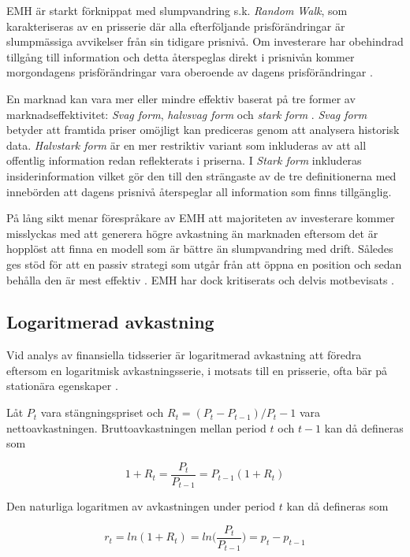 \documentclass[11pt]{article}
\begin{document}
EMH är starkt förknippat med slumpvandring s.k. \emph{Random Walk}, som karakteriseras av en prisserie där alla efterföljande prisförändringar är slumpmässiga avvikelser från sin tidigare prisnivå. Om investerare har obehindrad tillgång till information och detta återspeglas direkt i prisnivån kommer morgondagens prisförändringar vara oberoende av dagens prisförändringar \parencite{EMH}. 

En marknad kan vara mer eller mindre effektiv baserat på tre former av marknadseffektivitet: \emph{Svag form}, \emph{halvsvag form} och \emph{stark form} \parencite{Fama1970}. \emph{Svag form} betyder att framtida priser omöjligt kan prediceras genom att analysera historisk data. \emph{Halvstark form} är en mer restriktiv variant som inkluderas av att all offentlig information redan reflekterats i priserna. I \emph{Stark form} inkluderas insiderinformation vilket gör den till den strängaste av de tre definitionerna med innebörden att dagens prisnivå återspeglar all information som finns tillgänglig.

På lång sikt menar förespråkare av EMH att majoriteten av investerare kommer misslyckas med att generera högre avkastning än marknaden eftersom det är hopplöst att finna en modell som är bättre än slumpvandring med drift. Således ges stöd för att en passiv strategi som utgår från att öppna en position och sedan behålla den är mest effektiv \parencite{EMHforecast}. EMH har dock kritiserats och delvis motbevisats \parencite{basu1977investment, ball1978anomalies}.

\subsection{Logaritmerad avkastning}
Vid analys av finansiella tidsserier är logaritmerad avkastning att föredra eftersom en logaritmisk avkastningsserie, i motsats till en prisserie, ofta bär på stationära egenskaper \parencite{Tsay2010}.

Låt \(P_t\) vara stängningspriset och $R_{t}= (P_{t} - P_{t-1}) / {P_t-1}$ vara nettoavkastningen. Bruttoavkastningen mellan period $t$ och $t-1$ kan då defineras som

\begin{equation}
    1+R_{t} = \frac{P_{t}}{P_{t-1}} = P_{t-1}(1+R_{t})
\end{equation}

Den naturliga logaritmen av avkastningen under period $t$ kan då defineras som

\begin{equation}
    r_{t}=ln(1 + R_{t})=ln\Big(\frac{P_{t}}{P_{t-1}}\Big)=p_{t}-p_{t-1}
\end{equation}
\end{document}

